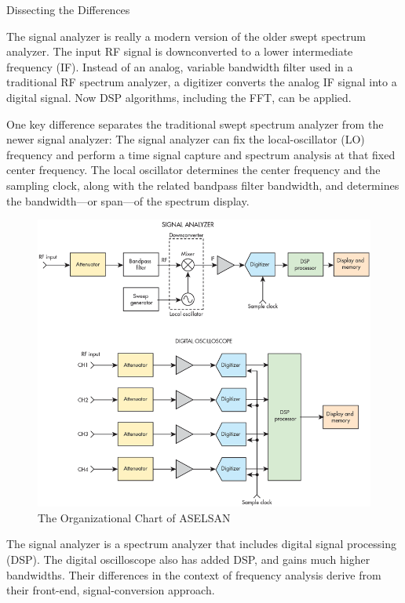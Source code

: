 Dissecting the Differences

The signal analyzer is really a modern version of the older swept spectrum analyzer. The input RF signal is downconverted to a lower intermediate frequency (IF). Instead of an analog, variable bandwidth filter used in a traditional RF spectrum analyzer, a digitizer converts the analog IF signal into a digital signal. Now DSP algorithms, including the FFT, can be applied.

One key difference separates the traditional swept spectrum analyzer from the newer signal analyzer: The signal analyzer can fix the local-oscillator (LO) frequency and perform a time signal capture and spectrum analysis at that fixed center frequency. The local oscillator determines the center frequency and the sampling clock, along with the related bandpass filter bandwidth, and determines the bandwidth—or span—of the spectrum display.

\begin{figure}[H]
	\center
	\setlength{\unitlength}{\textwidth} 
	\includegraphics[width=0.85\unitlength]{ansosc}
	\caption{\label{fig:ansosc}The Organizational Chart of ASELSAN }
\end{figure}

The signal analyzer is a spectrum analyzer that includes digital signal processing (DSP). The digital oscilloscope also has added DSP, and gains much higher bandwidths. Their differences in the context of frequency analysis derive from their front-end, signal-conversion approach.

